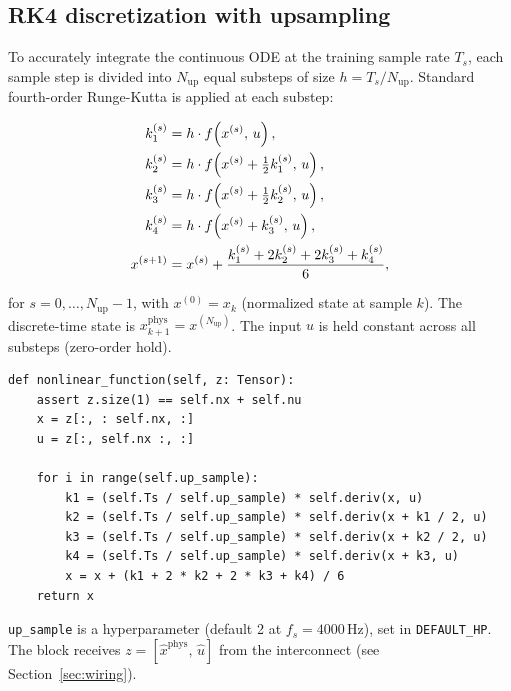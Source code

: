 \documentclass[11pt,a4paper]{article}
\newcommand{\code}[1]{\texttt{#1}}
\newcommand{\codetitle}[2]{\small\texttt{#1}\quad lines #2}
\begin{document}
\subsection{RK4 discretization with upsampling}

To accurately integrate the continuous ODE at the training sample rate
$T_s$, each sample step is divided into $N_{\mathrm{up}}$ equal substeps
of size $h = T_s / N_{\mathrm{up}}$.
Standard fourth-order Runge-Kutta is applied at each substep:

\begin{align}
  k_1^{(s)} &= h \cdot f\!\left(x^{(s)},\, u\right), \notag \\
  k_2^{(s)} &= h \cdot f\!\left(x^{(s)} + \tfrac{1}{2}k_1^{(s)},\, u\right), \notag \\
  k_3^{(s)} &= h \cdot f\!\left(x^{(s)} + \tfrac{1}{2}k_2^{(s)},\, u\right), \notag \\
  k_4^{(s)} &= h \cdot f\!\left(x^{(s)} + k_3^{(s)},\, u\right), \notag \\
  x^{(s+1)} &= x^{(s)} + \frac{k_1^{(s)} + 2k_2^{(s)} + 2k_3^{(s)} + k_4^{(s)}}{6},
  \label{eq:rk4}
\end{align}

for $s = 0, \ldots, N_{\mathrm{up}}-1$, with $x^{(0)} = x_k$ (normalized state
at sample $k$).
The discrete-time state is $x_{k+1}^{\mathrm{phys}} = x^{(N_{\mathrm{up}})}$.
The input $u$ is held constant across all substeps (zero-order hold).

\begin{lstlisting}[style=py,
  title={\codetitle{model\_augmentation/fit\_systems/blocks.py}{757--769} -- \texttt{Gantry\_State\_Block.nonlinear\_function()}},
  firstnumber=757]
def nonlinear_function(self, z: Tensor):
    assert z.size(1) == self.nx + self.nu
    x = z[:, : self.nx, :]
    u = z[:, self.nx :, :]

    for i in range(self.up_sample):
        k1 = (self.Ts / self.up_sample) * self.deriv(x, u)
        k2 = (self.Ts / self.up_sample) * self.deriv(x + k1 / 2, u)
        k3 = (self.Ts / self.up_sample) * self.deriv(x + k2 / 2, u)
        k4 = (self.Ts / self.up_sample) * self.deriv(x + k3, u)
        x = x + (k1 + 2 * k2 + 2 * k3 + k4) / 6
    return x
\end{lstlisting}

\code{up\_sample} is a hyperparameter (default 2 at $f_s = 4000\,\mathrm{Hz}$),
set in \code{DEFAULT\_HP}. The block receives $z = [\hat{x}^{\mathrm{phys}},\, \hat{u}]$
from the interconnect (see Section~\ref{sec:wiring}).
\end{document}
